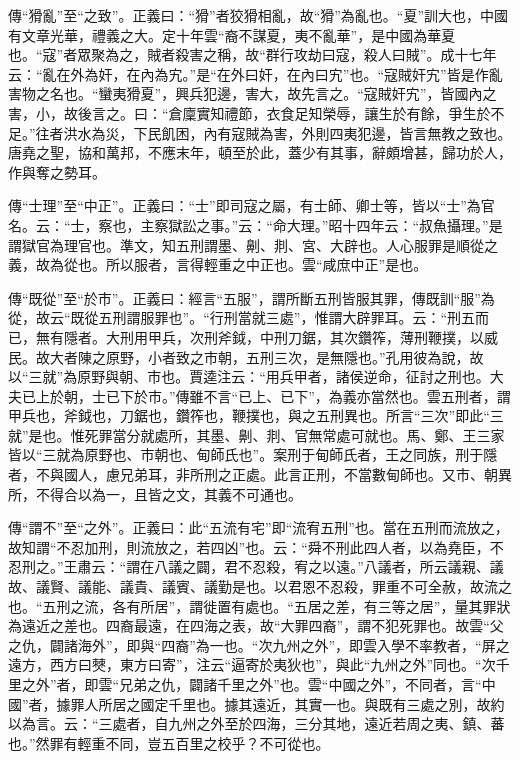 {\noindent\zhuan{}\fzbyks 傳“猾亂”至“之致”。正義曰：“猾”者狡猾相亂，故“猾”為亂也。“夏”訓大也，中國有文章光華，禮義之大。定十年雲“裔不謀夏，夷不亂華”，是中國為華夏也。“寇”者眾聚為之，賊者殺害之稱，故“群行攻劫曰寇，殺人曰賊”。成十七年云：“亂在外為奸，在內為宄。”是“在外曰奸，在內曰宄”也。“寇賊奸宄”皆是作亂害物之名也。“蠻夷猾夏”，興兵犯邊，害大，故先言之。“寇賊奸宄”，皆國內之害，小，故後言之。曰：“倉廩實知禮節，衣食足知榮辱，讓生於有餘，爭生於不足。”往者洪水為災，下民飢困，內有寇賊為害，外則四夷犯邊，皆言無教之致也。唐堯之聖，協和萬邦，不應末年，頓至於此，蓋少有其事，辭頗增甚，歸功於人，作與奪之勢耳。 \par}

{\noindent\zhuan{}\fzbyks 傳“士理”至“中正”。正義曰：“士”即司寇之屬，有士師、卿士等，皆以“士”為官名。云：“士，察也，主察獄訟之事。”云：“命大理。”昭十四年云：“叔魚攝理。”是謂獄官為理官也。準文，知五刑謂墨、劓、剕、宮、大辟也。人心服罪是順從之義，故為從也。所以服者，言得輕重之中正也。雲“咸庶中正”是也。 \par}

{\noindent\zhuan{}\fzbyks 傳“既從”至“於市”。正義曰：經言“五服”，謂所斷五刑皆服其罪，傳既訓“服”為從，故云“既從五刑謂服罪也”。“行刑當就三處”，惟謂大辟罪耳。云：“刑五而已，無有隱者。大刑用甲兵，次刑斧鉞，中刑刀鋸，其次鑽筰，薄刑鞭撲，以威民。故大者陳之原野，小者致之市朝，五刑三次，是無隱也。”孔用彼為說，故以“三就”為原野與朝、市也。賈逵注云：“用兵甲者，諸侯逆命，征討之刑也。大夫已上於朝，士已下於市。”傳雖不言“已上、已下”，為義亦當然也。雲五刑者，謂甲兵也，斧鉞也，刀鋸也，鑽筰也，鞭撲也，與之五刑異也。所言“三次”即此“三就”是也。惟死罪當分就處所，其墨、劓、剕、官無常處可就也。馬、鄭、王三家皆以“三就為原野也、市朝也、甸師氏也”。案刑于甸師氏者，王之同族，刑于隱者，不與國人，慮兄弟耳，非所刑之正處。此言正刑，不當數甸師也。又市、朝異所，不得合以為一，且皆之文，其義不可通也。 \par}

{\noindent\zhuan{}\fzbyks 傳“謂不”至“之外”。正義曰：此“五流有宅”即“流宥五刑”也。當在五刑而流放之，故知謂“不忍加刑，則流放之，若四凶”也。云：“舜不刑此四人者，以為堯臣，不忍刑之。”王肅云：“謂在八議之闢，君不忍殺，宥之以遠。”八議者，所云議親、議故、議賢、議能、議貴、議賓、議勤是也。以君恩不忍殺，罪重不可全赦，故流之也。“五刑之流，各有所居”，謂徙置有處也。“五居之差，有三等之居”，量其罪狀為遠近之差也。四裔最遠，在四海之表，故“大罪四裔”，謂不犯死罪也。故雲“父之仇，闢諸海外”，即與“四裔”為一也。“次九州之外”，即雲入學不率教者，“屏之遠方，西方曰僰，東方曰寄”，注云“逼寄於夷狄也”，與此“九州之外”同也。“次千里之外”者，即雲“兄弟之仇，闢諸千里之外”也。雲“中國之外”，不同者，言“中國”者，據罪人所居之國定千里也。據其遠近，其實一也。與既有三處之別，故約以為言。云：“三處者，自九州之外至於四海，三分其地，遠近若周之夷、鎮、蕃也。”然罪有輕重不同，豈五百里之校乎？不可從也。 \par}

